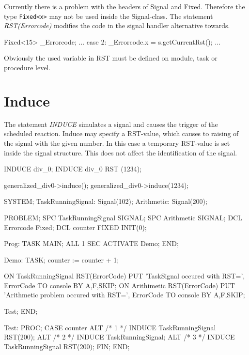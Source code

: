 Currently there is a problem with the headers of Signal and Fixed.
Therefore the type \verb|Fixed<x>| may not be used inside the Signal-class.
The statement {\em RST(Errorcode)} modifies the code in the signal handler
alternative towards.

\begin{CppCode}
Fixed<15> _Errorcode;
...
case 2:
   _Errorcode.x = s.getCurrentRst();
   ...
\end{CppCode}
Obviously the used variable in RST must be defined on module,
 task or procedure level. 

\section{Induce}
The statement {\em INDUCE} simulates a signal and causes the trigger 
of the scheduled reaction.
Induce may specify a RST-value, which causes to raising of the 
signal with the given number.
In this case a temporary RST-value is set inside the signal structure.
This does not affect the identification of the signal.


\begin{PEARLCode}
INDUCE div_0;
INDUCE div_0 RST (1234);
\end{PEARLCode}

\begin{CppCode}
generalized_div0->induce();
generalized_div0->induce(1234);
\end{CppCode}

\begin{PEARLCode}
SYSTEM;
   TaskRunningSignal: Signal(102);
   Arithmetic: Signal(200);

PROBLEM;
   SPC TaskRunningSignal SIGNAL;
   SPC Arithmetic SIGNAL;
   DCL Errorcode Fixed;
   DCL counter FIXED INIT(0);

Prog: TASK MAIN;
    ALL 1 SEC ACTIVATE Demo;
END;

Demo: TASK; 
   counter := counter + 1;

   ON TaskRunningSignal RST(ErrorCode)
	PUT 'TaskSignal occured with RST=', ErrorCode TO console BY A,F,SKIP;
   ON Arithimetic RST(ErrorCode)
	PUT 'Arithmetic problem occured with RST=', ErrorCode TO console BY A,F,SKIP;

   Test;
END;

Test: PROC;
   CASE counter
   ALT /* 1 */ INDUCE TaskRunningSignal RST(200);
   ALT /* 2 */ INDUCE TaskRunningSignal;
   ALT /* 3 */ INDUCE TaskRunningSignal RST(200);
   FIN;
END;
\end{PEARLCode}

